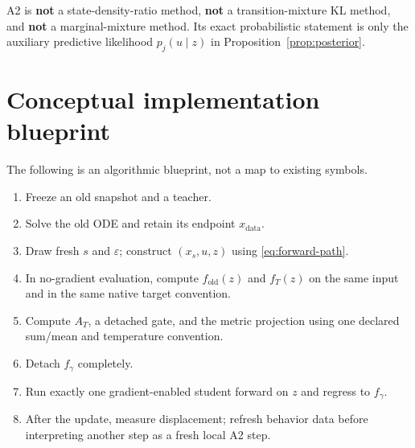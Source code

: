 \documentclass[11pt,a4paper]{article}
\newcommand{\old}{\mathrm{old}}
\newcommand{\data}{\mathrm{data}}
\theoremstyle{plain}
\theoremstyle{definition}
\begin{document}
\begin{tcolorbox}[colback=red!4,colframe=red!45!black,title=Terminology boundary]
A2 is \textbf{not} a state-density-ratio method, \textbf{not} a transition-mixture KL method, and
\textbf{not} a marginal-mixture method.  Its exact probabilistic statement is only the auxiliary
predictive likelihood $p_j(u\mid z)$ in Proposition~\ref{prop:posterior}.
\end{tcolorbox}

\section{Conceptual implementation blueprint}
\label{sec:blueprint}

The following is an algorithmic blueprint, not a map to existing symbols.
\begin{enumerate}[leftmargin=1.6em]
\item Freeze an old snapshot and a teacher.
\item Solve the old ODE and retain its endpoint $x_{\data}$.
\item Draw fresh $s$ and $\varepsilon$; construct $(x_s,u,z)$ using
      \eqref{eq:forward-path}.
\item In no-gradient evaluation, compute $f_{\old}(z)$ and $f_T(z)$ on the same input and in the
      same native target convention.
\item Compute $A_T$, a detached gate, and the metric projection using one declared sum/mean and
      temperature convention.
\item Detach $f_\gamma$ completely.
\item Run exactly one gradient-enabled student forward on $z$ and regress to $f_\gamma$.
\item After the update, measure displacement; refresh behavior data before interpreting another
      step as a fresh local A2 step.
\end{enumerate}
\end{document}
